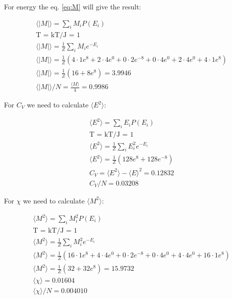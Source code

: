 For energy the eq. \ref{eq:M} will give the result:

\begin{align*}
    &\langle |M| \rangle = \sum_i M_iP(E_i)
    \\
    &\text{T = kT/J = 1} 
    \\
    &\langle |M| \rangle = \frac{1}{Z} \sum_i M_i e^{-E_i}
    \\
    &\langle |M| \rangle 
    = 
    \frac{1}{Z} 
    \left(
      4\cdot1e^{8} 
    + 2\cdot4e^{0} 
    + 0\cdot2e^{-8} 
    + 0\cdot4e^{0} 
    + 2\cdot4e^{0}  
    + 4\cdot1e^{8}
    \right) 
    \\
    &\langle |M| \rangle 
    = 
    \frac{1}{Z} 
    \left(
    16
    + 8 e^{8}
    \right) = 3.9946
    \\ 
    &\langle |M| \rangle /N= \frac{\langle M \rangle}{4} = 0.9986
\end{align*}


\pagebreak
For $C_V$ we need to calculate $\langle E^2 \rangle$:

\begin{align*}
    &\langle E^2 \rangle = \sum_i E_iP(E_i)
    \\
    &\text{T = kT/J = 1} 
    \\
    &\langle E^2 \rangle = \frac{1}{Z} \sum_i E_i^2 e^{-E_i}
    \\
    &\langle E^2 \rangle = \frac{1}{Z} \left( 128 e^8 + 128 e^{-8} \right)
    \\
    &C_V = \langle E^2 \rangle - \langle E \rangle^2 = 0.12832
    \\ 
    &C_V/N = 0.03208
\end{align*}



For $\chi$ we need to calculate $\langle M^2 \rangle$:

\begin{align*}
    &\langle M^2 \rangle = \sum_i M_i^2P(E_i)
    \\
    &\text{T = kT/J = 1} 
    \\
    &\langle M^2 \rangle = \frac{1}{Z} \sum_i M_i^2 e^{-E_i}
    \\
    &\langle M^2 \rangle 
    = 
    \frac{1}{Z} 
    \left(
      16\cdot1e^{8} 
    + 4\cdot4e^{0} 
    + 0\cdot2e^{-8} 
    + 0\cdot4e^{0} 
    + 4\cdot4e^{0}  
    + 16\cdot1e^{8}
    \right) 
    \\
    &\langle M^2 \rangle 
    = 
    \frac{1}{Z} 
    \left(
    32
    + 32 e^{8}
    \right) = 15.9732
    \\
    &\langle \chi \rangle = 0.01604
    \\
    &\langle \chi \rangle / N = 0.004010
\end{align*}

